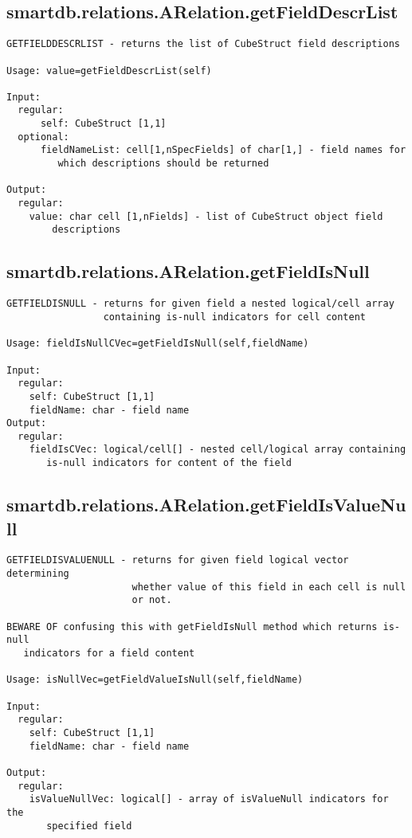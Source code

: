 \subsection{\texorpdfstring{smartdb.relations.ARelation.getFieldDescrList}{getFieldDescrList}}\label{method:smartdb.relations.ARelation.getFieldDescrList}
\begin{verbatim}
GETFIELDDESCRLIST - returns the list of CubeStruct field descriptions

Usage: value=getFieldDescrList(self)

Input:
  regular:
      self: CubeStruct [1,1]
  optional:
      fieldNameList: cell[1,nSpecFields] of char[1,] - field names for
         which descriptions should be returned

Output:
  regular:
    value: char cell [1,nFields] - list of CubeStruct object field
        descriptions
\end{verbatim}
\subsection{\texorpdfstring{smartdb.relations.ARelation.getFieldIsNull}{getFieldIsNull}}\label{method:smartdb.relations.ARelation.getFieldIsNull}
\begin{verbatim}
GETFIELDISNULL - returns for given field a nested logical/cell array
                 containing is-null indicators for cell content

Usage: fieldIsNullCVec=getFieldIsNull(self,fieldName)

Input:
  regular:
    self: CubeStruct [1,1]
    fieldName: char - field name
Output:
  regular:
    fieldIsCVec: logical/cell[] - nested cell/logical array containing
       is-null indicators for content of the field
\end{verbatim}
\subsection{\texorpdfstring{smartdb.relations.ARelation.getFieldIsValueNull}{getFieldIsValueNull}}\label{method:smartdb.relations.ARelation.getFieldIsValueNull}
\begin{verbatim}
GETFIELDISVALUENULL - returns for given field logical vector determining
                      whether value of this field in each cell is null
                      or not.

BEWARE OF confusing this with getFieldIsNull method which returns is-null
   indicators for a field content

Usage: isNullVec=getFieldValueIsNull(self,fieldName)

Input:
  regular:
    self: CubeStruct [1,1]
    fieldName: char - field name

Output:
  regular:
    isValueNullVec: logical[] - array of isValueNull indicators for the
       specified field
\end{verbatim}

